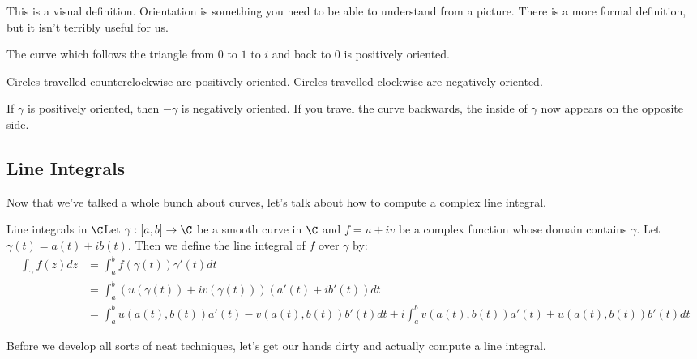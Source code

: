 This is a visual definition. Orientation is something you need to be able to understand from a picture. There is a more formal definition, but it isn't terribly useful for us.

\begin{ex}{}{} The curve which follows the triangle from $0$ to $1$ to $i$ and back to $0$ is positively oriented.

Circles travelled counterclockwise are positively oriented. Circles travelled clockwise are negatively oriented.

\end{ex}

\begin{ex}{}{} If $\gamma$ is positively oriented, then $-\gamma$ is negatively oriented. If you travel the curve backwards, the inside of $\gamma$ now appears on the opposite side.
\end{ex}

\subsection{Line Integrals}

Now that we've talked a whole bunch about curves, let's talk about how to compute a complex line integral.

\begin{defbo}{Line integrals in $\C$}{}Let $\gamma:[a,b]\rightarrow \C$ be a smooth curve in $\C$ and $f = u + iv$ be a complex function whose domain contains $\gamma$. Let $\gamma(t) = a(t) + ib(t)$. Then we define the line integral of $f$ over $\gamma$ by:
\begin{align*}\int_{\gamma} f(z)dz &= \int_{a}^b f(\gamma(t))\gamma'(t)dt\\
&= \int_{a}^{b} (u(\gamma(t)) + iv(\gamma(t)))(a'(t) + ib'(t))dt\\
&= \int_{a}^b u(a(t),b(t))a'(t) - v(a(t),b(t))b'(t)dt + i \int_{a}^b v(a(t),b(t))a'(t) + u(a(t),b(t))b'(t)dt
\end{align*}
\end{defbo}

Before we develop all sorts of neat techniques, let's get our hands dirty and actually compute a line integral.


